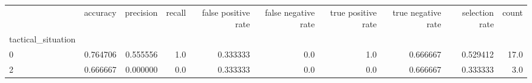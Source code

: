\begin{tabular}{lrrrrrrrrr}
\toprule
{} &  accuracy &  precision &  recall &  false positive rate &  false negative rate &  true positive rate &  true negative rate &  selection rate &  count \\
tactical\_situation &           &            &         &                      &                      &                     &                     &                 &        \\
\midrule
0                  &  0.764706 &   0.555556 &     1.0 &             0.333333 &                  0.0 &                 1.0 &            0.666667 &        0.529412 &   17.0 \\
2                  &  0.666667 &   0.000000 &     0.0 &             0.333333 &                  0.0 &                 0.0 &            0.666667 &        0.333333 &    3.0 \\
\bottomrule
\end{tabular}
